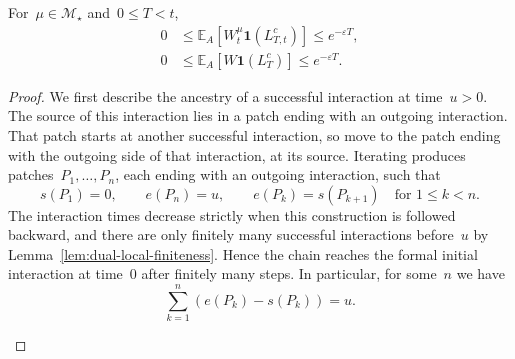 \documentclass[EJP,preprint,NODS,nobera]{ejpecp}
\newcommand{\E}{\mathbb{E}}
\newcommand{\bb}[1]{\left(#1\right)}
\newcommand{\Cb}[1]{\left[#1\right]}
\newcommand{\ind}{\mathbf{1}}
\begin{document}
\begin{lemma}
\label{lem:late-interactions}
For~$\mu\in\mathcal M_\star$ and~$0\leq T<t$,
\begin{align}
0
&\leq
\E_A\Cb{W_t^\mu\ind\bb{L_{T,t}^c}}
\leq
e^{-\varepsilon T},
\label{eq:finite-late-interaction-bound}
\\
0
&\leq
\E_A\Cb{W\ind\bb{L_T^c}}
\leq
e^{-\varepsilon T}.
\label{eq:limiting-late-interaction-bound}
\end{align}
\end{lemma}

\begin{proof}
We first describe the ancestry of a successful interaction at time~$u>0$.
The source of this interaction lies in a patch ending with an outgoing
interaction. That patch starts at another successful interaction, so move to
the patch ending with the outgoing side of that interaction, at its source.
Iterating produces patches~$P_1,\ldots,P_n$, each ending with an outgoing
interaction, such that
\begin{equation*}
s(P_1)=0,
\qquad
e(P_n)=u,
\qquad
e(P_k)=s(P_{k+1})
\quad\text{for }1\leq k<n.
\end{equation*}
The interaction times decrease strictly when this construction is followed
backward, and there are only finitely many successful interactions before~$u$
by Lemma~\ref{lem:dual-local-finiteness}. Hence the chain reaches the formal
initial interaction at time~$0$ after finitely many steps. In particular, for some~$n$ we have
\begin{equation}
\label{eq:outgoing-chain-total-length}
\sum_{k=1}^n\bb{e(P_k)-s(P_k)}
=
u.
\end{equation}

\begin{figure}[htbp]
\centering
\begingroup
{}
\end{figure}
\end{proof}
\end{document}
